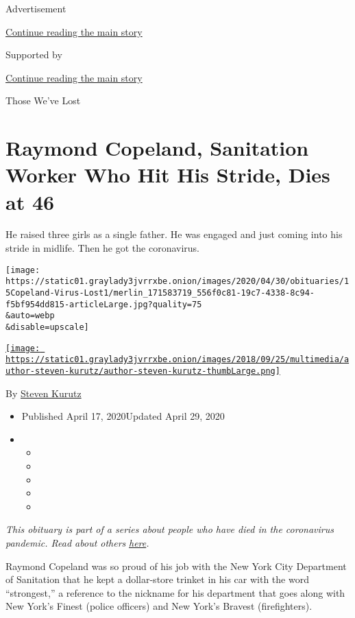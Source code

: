 Advertisement

\protect\hyperlink{after-top}{Continue reading the main story}

Supported by

\protect\hyperlink{after-sponsor}{Continue reading the main story}

Those We've Lost

\hypertarget{raymond-copeland-sanitation-worker-who-hit-his-stride-dies-at-46}{%
\section{Raymond Copeland, Sanitation Worker Who Hit His Stride, Dies at
46}\label{raymond-copeland-sanitation-worker-who-hit-his-stride-dies-at-46}}

He raised three girls as a single father. He was engaged and just coming
into his stride in midlife. Then he got the coronavirus.

\texttt{[image: https://static01.graylady3jvrrxbe.onion/images/2020/04/30/obituaries/15Copeland-Virus-Lost1/merlin\_171583719\_556f0c81-19c7-4338-8c94-f5bf954dd815-articleLarge.jpg?quality=75\\\&auto=webp\\\&disable=upscale]}

\href{https://www.nytimes3xbfgragh.onion/by/steven-kurutz}{\texttt{[image: https://static01.graylady3jvrrxbe.onion/images/2018/09/25/multimedia/author-steven-kurutz/author-steven-kurutz-thumbLarge.png]}}

By \href{https://www.nytimes3xbfgragh.onion/by/steven-kurutz}{Steven
Kurutz}

\begin{itemize}
\item
  Published April 17, 2020Updated April 29, 2020
\item
  \begin{itemize}
  \item
  \item
  \item
  \item
  \item
  \end{itemize}
\end{itemize}

\emph{This obituary is part of a series about people who have died in
the coronavirus pandemic. Read about others}
\href{https://www.nytimes3xbfgragh.onion/series/people-who-have-died-of-the-coronavirus}{\emph{here}}\emph{.}

Raymond Copeland was so proud of his job with the New York City
Department of Sanitation that he kept a dollar-store trinket in his car
with the word ``strongest,'' a reference to the nickname for his
department that goes along with New York's Finest (police officers) and
New York's Bravest (firefighters).

